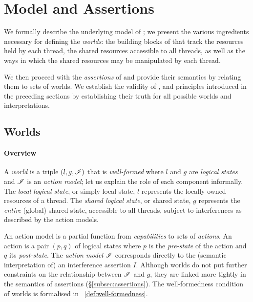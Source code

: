 \section{\colosl Model and Assertions}\label{sec:logic}
We formally describe the underlying model of \colosl; we present the various ingredients necessary for defining the \colosl \emph{worlds}: the building blocks of \colosl that track the resources held by each thread, the shared resources accessible to all threads, as well as the ways in which the shared resources may be manipulated by each thread.

We then proceed with the \emph{assertions} of \colosl and provide their semantics by relating them to sets of worlds. We establish the validity of \copyRule, \forgetRule and \mergeRule principles introduced in the preceding sections by establishing their truth for all possible worlds and interpretations.

\subsection{Worlds}
\paragraph{\textbf{Overview}}
A \emph{world} is a triple $(l, g, \mathscr{I})$ that is \emph{well-formed} where $l$ and $g$ are \emph{logical states} and $\mathscr{I}$ is an \emph{action model}; let us explain the role of each component informally. The \emph{local logical state}, or simply local state, $l$ represents the locally owned resources of a thread. The \emph{shared logical state}, or shared state, $g$ represents the \emph{entire} (global) shared state, accessible to all threads, subject to interferences as described by the action models.

An action model is a partial function from \emph{capabilities} to sets of \emph{actions}. An action is a pair $(p,q)$ of logical states where $p$ is the \emph{pre-state} of the action and $q$ its \emph{post-state}.  The \emph{action model} $\mathscr{I}$ corresponds directly to the (semantic interpretation of) an interference assertion $I$. Although worlds do not put further constraints on the
relationship between $\mathscr{I}$ and $g$, they are linked more tightly in the semantics of assertions (\S\ref{subsec:assertions}). The well-formedness condition of worlds is formalised in ~\ref{def:well-formedness}.


